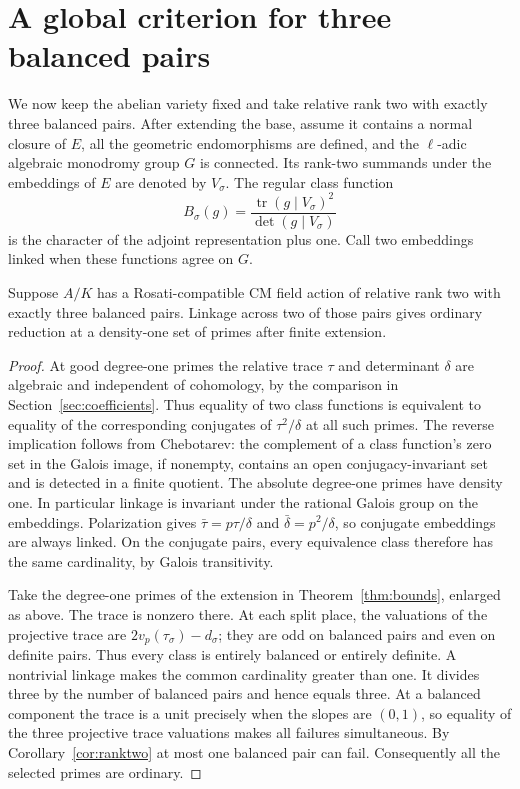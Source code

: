 \section{A global criterion for three balanced pairs}\label{sec:linked}

We now keep the abelian variety fixed and take relative rank two
with exactly three balanced pairs. After extending the base,
assume it contains a normal closure of \(E\), all the geometric
endomorphisms are defined, and the \(\ell\)-adic algebraic monodromy
group \(G\) is connected. Its rank-two summands under the embeddings
of \(E\) are denoted by \(V_\sigma\).
The regular class function
\[
 B_\sigma(g)=\frac{\operatorname{tr}(g\mid V_\sigma)^2}
                  {\det(g\mid V_\sigma)}
\]
is the character of the adjoint representation plus one. Call
two embeddings linked when these functions agree on \(G\).

\begin{theorem}\label{thm:linked}
Suppose \(A/K\) has a Rosati-compatible CM field action of relative rank
two with exactly three balanced pairs. Linkage across two of those pairs
gives ordinary reduction at a density-one set of primes after finite extension.
\end{theorem}

\begin{proof}
At good degree-one primes the relative trace \(\tau\) and determinant
\(\delta\) are algebraic and independent of cohomology, by the
comparison in Section~\ref{sec:coefficients}. Thus equality of two
class functions is equivalent to equality of the corresponding
conjugates of \(\tau^2/\delta\) at all such primes. The reverse
implication follows from Chebotarev: the complement of a class
function's zero set in the Galois image, if nonempty, contains an
open conjugacy-invariant set and is detected in a finite quotient.
The absolute degree-one primes have density one. In particular
linkage is invariant under the rational Galois group on the
embeddings. Polarization gives
\(\bar\tau=p\tau/\delta\) and \(\bar\delta=p^2/\delta\),
so conjugate embeddings are always linked.
On the conjugate pairs, every equivalence class therefore has the
same cardinality, by Galois transitivity.

Take the degree-one primes of the extension in
Theorem~\ref{thm:bounds}, enlarged as above. The trace is nonzero
there. At each split place, the valuations of the projective
trace are \(2v_p(\tau_\sigma)-d_\sigma\); they are odd on
balanced pairs and even on definite pairs. Thus every class is
entirely balanced or entirely definite. A nontrivial linkage
makes the common cardinality greater than one. It divides three
by the number of balanced pairs and hence equals three.
At a balanced component the trace is a unit precisely when the
slopes are \((0,1)\), so equality of the three projective trace
valuations makes all failures simultaneous. By
Corollary~\ref{cor:ranktwo} at most one balanced pair can fail.
Consequently all the selected primes are ordinary.
\end{proof}


